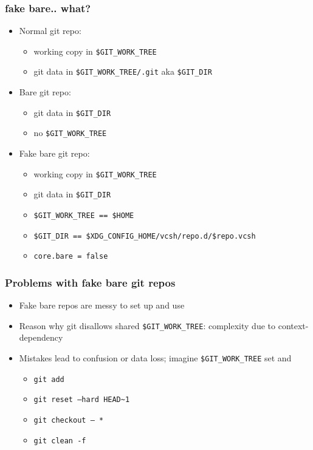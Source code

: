 \documentclass[t]{beamer}
\begin{document}
\begin{frame}
	\frametitle{fake bare.. what?}
	\begin{itemize}
		\item Normal git repo:
		\begin{itemize}
			\item working copy in \texttt{\$GIT\_WORK\_TREE}
			\item git data in \texttt{\$GIT\_WORK\_TREE/.git} aka \texttt{\$GIT\_DIR}
		\end{itemize}
		\item Bare git repo:
		\begin{itemize}
			\item git data in \texttt{\$GIT\_DIR}
			\item no  \texttt{\$GIT\_WORK\_TREE}
		\end{itemize}
		\item Fake bare git repo:
		\begin{itemize}
			\item working copy in \texttt{\$GIT\_WORK\_TREE}
			\item git data in \texttt{\$GIT\_DIR}
			\item \texttt{\$GIT\_WORK\_TREE == \$HOME}
			\item \texttt{\$GIT\_DIR == \$XDG\_CONFIG\_HOME/vcsh/repo.d/\$repo.vcsh}
			\item \texttt{core.bare = false}
		\end{itemize}
	\end{itemize}
\end{frame}

\begin{frame}
	\frametitle{Problems with fake bare git repos}
	\begin{itemize}
		\item Fake bare repos are messy to set up and use
		\item Reason why git disallows shared \texttt{\$GIT\_WORK\_TREE}: complexity due to context-dependency
		\item Mistakes lead to confusion or data loss; imagine \texttt{\$GIT\_WORK\_TREE} set and
		\begin{itemize}
			\item \texttt{git add}
			\item \texttt{git reset --hard HEAD\~{}1}
			\item \texttt{git checkout -- *}
			\item \texttt{git clean -f}
		\end{itemize}
	\end{itemize}
\end{frame}
\end{document}
